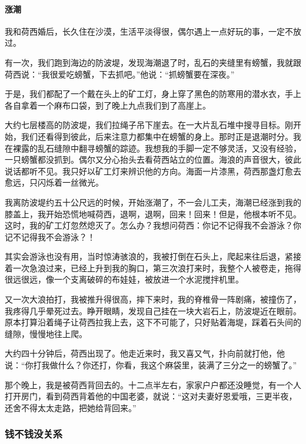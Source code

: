 \paragraph*{涨潮}
\par 我和荷西婚后，长久住在沙漠，生活平淡得很，偶尔遇上一点好玩的事，一定不放过。
\par 有一次，我们跑到海边的防波堤，发现海潮退了时，乱石的夹缝里有螃蟹，我就跟荷西说：“我很爱吃螃蟹，下去抓吧。”他说：“抓螃蟹要在深夜。”
\par 于是，我们都配了一个戴在头上的矿工灯，身上穿了黑色的防寒用的潜水衣，手上各自拿着一个麻布口袋，到了晚上九点我们到了高崖上。
\par 大约七层楼高的防波堤，我们拉绳子吊下崖去。在一大片乱石堆中搜寻目标。刚开始，我们还看得到彼此，后来注意力都集中在螃蟹的身上。那时正是退潮时分。我在裸露的乱石缝隙中翻寻螃蟹的踪迹。我想我的手脚一定不够灵活，又没有经验，一只螃蟹都没抓到。偶尔又分心抬头去看荷西站立的位置。海浪的声音很大，彼此说话都听不见。我只好以矿工灯来辨识他的方向。海面一片漆黑，荷西那盏灯愈去愈远，只闪烁着一丝微光。
\par 我离防波堤约五十公尺远的时候，开始涨潮了，不一会儿工夫，海潮已经涨到我的膝盖上，我开始恐慌地喊荷西，退啊，退啊，回来！回来！但是，他根本听不见。这时，我的矿工灯忽然熄灭了。怎么办？我想问荷西：你记不记得我不会游泳？你记不记得我不会游泳？！
\par 其实会游泳也没有用，当时惊涛骇浪的，我被打倒在石头上，爬起来往后退，紧接着一次急浪过来，已经上升到我的胸口，第三次浪打来时，我整个人被卷走，拖得很远很远，像一个支离破碎的布娃娃，被放进一个水泥搅拌机里。
\par 又一次大浪拍打，我被推升得很高，摔下来时，我的脊椎骨一阵剧痛，被撞伤了，我疼得几乎晕死过去。睁开眼睛，发现自己挂在一块大岩石上，防波堤近在眼前。原本打算沿着绳子让荷西拉我上去，这下不可能了，只好贴着海堤，踩着石头间的缝隙，慢慢地往上爬。
\par 大约四十分钟后，荷西出现了。他走近来时，我又喜又气，扑向前就打他，他说：“你打我做什么？你还打，你看，我这个麻袋里，装满了三分之一的螃蟹了。”
\par 那个晚上，我是被荷西背回去的。十二点半左右，家家户户都还没睡觉，有一个人打开房门，看到荷西背着他的中国老婆，就说：“这对夫妻好恩爱哦，三更半夜，还舍不得太太走路，把她给背回来。”



\subsubsection{钱不钱没关系}


